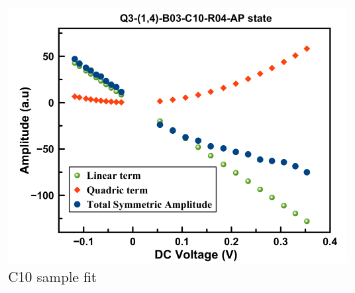\begin{figure}[!ht]
  \centering
  \includegraphics[width=0.8\textwidth]{fig/2018/C10DCFIT}
   \caption{C10 sample fit}
  \label{fig:C10DCfit}
\end{figure}



\begin{figure}[!ht]
\centering
{}
\caption{}
\end{figure}



\newpage

